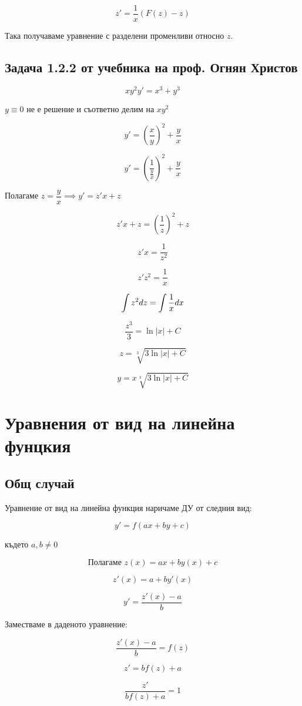 \documentclass{scrartcl}
\begin{document}
$$z' = \dfrac{1}{x} (F(z) - z)$$

Така получаваме уравнение с разделени променливи относно $z$.

\subsection{Задача 1.2.2 от учебника на проф. Огнян Христов}

$$xy^2y' = x^3+y^3$$

$y \equiv 0$ не е решение и съответно делим на $xy^2$

$$y' = \left(\dfrac{x}{y}\right)^2 + \dfrac{y}{x}$$

$$y' = \left(\dfrac{1}{\frac{y}{x}}\right)^2 + \dfrac{y}{x}$$

Полагаме $z = \dfrac{y}{x} \implies y' = z'x+z$

$$z'x+z=\left(\dfrac{1}{z}\right)^2+z$$

$$z'x=\dfrac{1}{z^2}$$

$$z'z^2=\dfrac{1}{x}$$

$$\displaystyle \int z^2 \space dz = \int \dfrac{1}{x}\space dx$$

$$\dfrac{z^3}{3} = \ln{|x|} + C$$

$$z = \sqrt[3]{3\ln{|x|}+C}$$

$$y = x\sqrt[3]{3\ln{|x|}+C}$$

\section{Уравнения от вид на линейна фунцкия}

\subsection{Общ случай}

Уравнение от вид на линейна функция наричаме ДУ от следния вид:

$$y' = f(ax + by + c)$$

където $a, b \ne 0$

$$\text{Полагаме }z(x) = ax + by(x) + c$$

$$z'(x) = a + by'(x)$$

$$y' = \dfrac{z'(x) - a}{b}$$

Заместваме в даденото уравнение:

$$\dfrac{z'(x) - a}{b} = f(z)$$

$$z' = bf(z) + a$$

$$\dfrac{z'}{bf(z) + a} = 1$$
\end{document}
